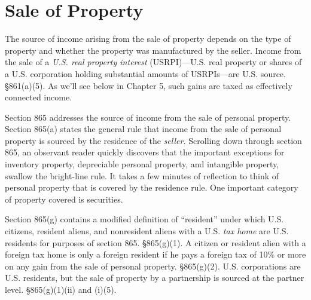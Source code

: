  
\section{Sale of Property}

The source of income arising from the sale of property depends on the type of property and whether the property was manufactured by the seller.  Income from the sale of a \emph{U.S. real property interest} (USRPI)---U.S. real property or shares of a U.S. corporation holding substantial amounts of USRPIs---are U.S. source.  \S861(a)(5).  As we'll see below in Chapter 5, such gains are taxed as effectively connected income.  

Section 865 addresses the source of income from the sale of personal property.  Section 865(a) states the general rule that income from the sale of personal property is sourced by the residence of the \emph{seller.}  Scrolling down through section 865, an observant reader quickly discovers that the important exceptions for inventory property, depreciable personal property, and intangible property, swallow the bright-line rule.  It takes a few minutes of reflection to think of personal property that is covered by the residence rule.  One important category of property covered is securities.  

Section 865(g) contains a modified definition of ``resident'' under which U.S. citizens, resident aliens, and nonresident aliens with a U.S. \emph{tax home} are U.S. residents for purposes of section 865. \S865(g)(1).   A citizen or resident alien with a foreign tax home is only a foreign resident if he pays a foreign tax of 10\% or more on any gain from the sale of personal property. \S865(g)(2).  U.S. corporations are U.S. residents, but the sale of property by a partnership is sourced at the partner level.  \S865(g)(1)(ii) and (i)(5).  

